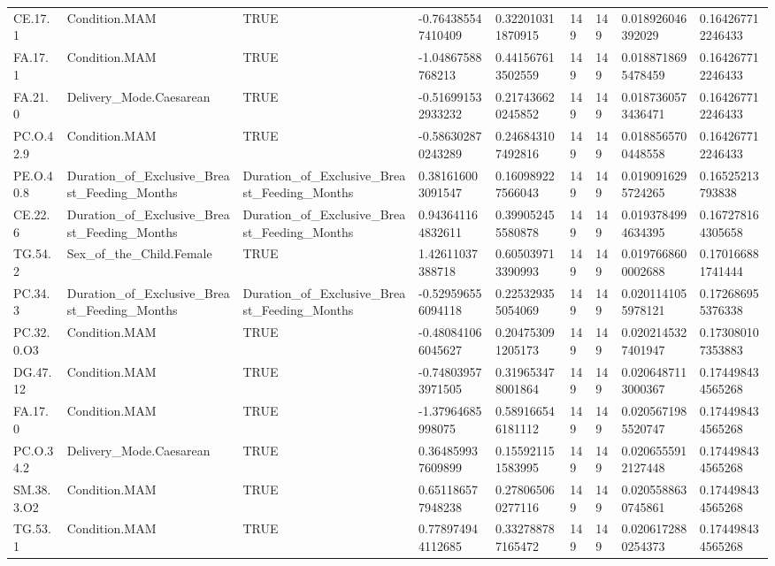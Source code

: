 \begin{longtable}{lllllllll}
CE.17.1 & Condition.MAM & TRUE & -0.764385547410409 & 0.322010311870915 & 149 & 149 & 0.018926046392029 & 0.164267712246433 \\
FA.17.1 & Condition.MAM & TRUE & -1.04867588768213 & 0.441567613502559 & 149 & 149 & 0.0188718695478459 & 0.164267712246433 \\
FA.21.0 & Delivery\_Mode.Caesarean & TRUE & -0.516991532933232 & 0.217436620245852 & 149 & 149 & 0.0187360573436471 & 0.164267712246433 \\
PC.O.42.9 & Condition.MAM & TRUE & -0.586302870243289 & 0.246843107492816 & 149 & 149 & 0.0188565700448558 & 0.164267712246433 \\
PE.O.40.8 & Duration\_of\_Exclusive\_Breast\_Feeding\_Months & Duration\_of\_Exclusive\_Breast\_Feeding\_Months & 0.381616003091547 & 0.160989227566043 & 149 & 149 & 0.0190916295724265 & 0.16525213793838 \\
CE.22.6 & Duration\_of\_Exclusive\_Breast\_Feeding\_Months & Duration\_of\_Exclusive\_Breast\_Feeding\_Months & 0.943641164832611 & 0.399052455580878 & 149 & 149 & 0.0193784994634395 & 0.167278164305658 \\
TG.54.2 & Sex\_of\_the\_Child.Female & TRUE & 1.42611037388718 & 0.605039713390993 & 149 & 149 & 0.0197668600002688 & 0.170166881741444 \\
PC.34.3 & Duration\_of\_Exclusive\_Breast\_Feeding\_Months & Duration\_of\_Exclusive\_Breast\_Feeding\_Months & -0.529596556094118 & 0.225329355054069 & 149 & 149 & 0.0201141055978121 & 0.172686955376338 \\
PC.32.0.O3 & Condition.MAM & TRUE & -0.480841066045627 & 0.204753091205173 & 149 & 149 & 0.0202145327401947 & 0.173080107353883 \\
DG.47.12 & Condition.MAM & TRUE & -0.748039573971505 & 0.319653478001864 & 149 & 149 & 0.0206487113000367 & 0.174498434565268 \\
FA.17.0 & Condition.MAM & TRUE & -1.37964685998075 & 0.589166546181112 & 149 & 149 & 0.0205671985520747 & 0.174498434565268 \\
PC.O.34.2 & Delivery\_Mode.Caesarean & TRUE & 0.364859937609899 & 0.155921151583995 & 149 & 149 & 0.0206555912127448 & 0.174498434565268 \\
SM.38.3.O2 & Condition.MAM & TRUE & 0.651186577948238 & 0.278065060277116 & 149 & 149 & 0.0205588630745861 & 0.174498434565268 \\
TG.53.1 & Condition.MAM & TRUE & 0.778974944112685 & 0.332788787165472 & 149 & 149 & 0.0206172880254373 & 0.174498434565268 \\

\end{longtable}
